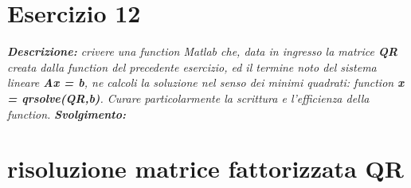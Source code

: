 \section{Esercizio 12}
\textit{\textbf{Descrizione:} crivere una function Matlab che, data in ingresso la matrice \textbf{QR} creata dalla function del precedente esercizio, ed il termine noto del sistema lineare \textbf{Ax = b}, ne calcoli la soluzione nel senso dei minimi quadrati: function \textbf{x = qrsolve(QR,b)}. Curare particolarmente la scrittura e l'efficienza della function.}\newline
\noindent \textit{\textbf{Svolgimento:}}\newline

\section*{risoluzione matrice fattorizzata QR}

\newpage
